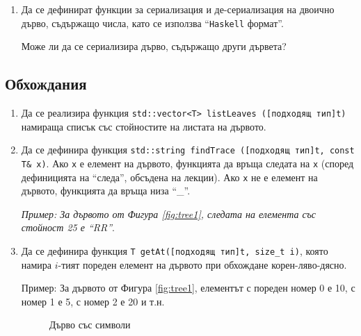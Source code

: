 \begin{enumerate}[resume]
\item Да се дефинират функции за сериализация и де-сериализация на двоично дърво, съдържащо числа, като се използва ``\texttt{Haskell} формат''.
  
Може ли да се сериализира дърво, съдържащо други дървета?
\end{enumerate}

\subsection {Обхождания}
\begin{enumerate}[resume]

  \item Да се реализира функция \texttt{std::vector<T> listLeaves ([подходящ тип]t)} намираща списък със стойностите на листата на дървото.

  \item Да се дефинира функция \texttt{std::string findTrace ([подходящ тип]t, const T\& x)}. Ако \texttt{x} е елемент на дървото, функцията да връща следата на \texttt{x} (според дефиницията на ``следа'', обсъдена на лекции). Ако \texttt{x} не е елемент на дървото, функцията да връща низа ``\_''.

  \textit{Пример: За дървото от Фигура \ref{fig:tree1}, следата на елемента със стойност 25 е ``RR''}.
    
  \item Да се дефинира функция \texttt{T getAt([подходящ тип]t, size\_t i)}, която намира $i$-тият пореден елемент на дървото при обхождане корен-ляво-дясно.
  
  Пример: За дървото от Фигура \ref{fig:tree1}, елементът с пореден номер 0 е 10, с номер 1 е 5, с номер 2 е 20 и т.н.


  \begin{figure}
    \centering
    \caption{Дърво със символи}
    \label{fig:chartree}
    \end{figure}
    

\end{enumerate}
